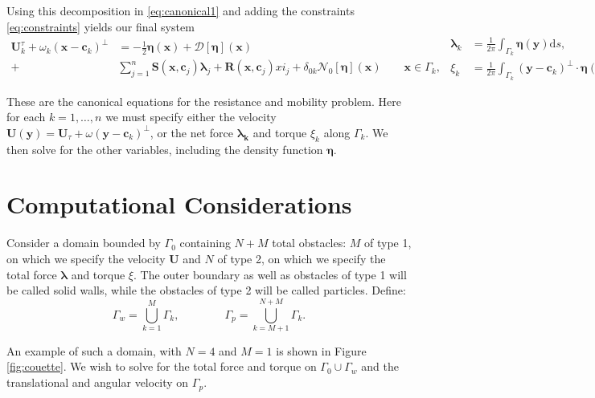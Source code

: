 Using this decomposition in \eqref{eq:canonical1} and adding the constraints \eqref{eq:constraints} yields our final system
\begin{subequations}\label{eq:canonical}
\begin{equation}\label{eq:canonical_a}
\begin{aligned}
	 \mathbf{U}^\tau_k + \omega_k(\mathbf{x} - \mathbf{c}_k)^\perp &= -\frac{1}{2}\pmb{\eta}(\mathbf{x}) + \mathcal{D}[\pmb{\eta}](\mathbf{x}) \\+ &\sum\limits_{j=1}^n \mathbf{S}(\mathbf{x},\mathbf{c}_j)\pmb{\lambda}_j + \mathbf{R}(\mathbf{x},\mathbf{c}_j)xi_j + \delta_{0k}\mathcal{N}_0[\pmb{\eta}](\mathbf{x}) \qquad \mathbf{x}\in\Gamma_k,
\end{aligned}
\end{equation}
\begin{align}
	\pmb{\lambda}_k &= \frac{1}{2\pi} \int_{\Gamma_k} \pmb{\eta}(\mathbf{y}) \text{d}s,\\
	\xi_k &= \frac{1}{2\pi}\int_{\Gamma_k} (\mathbf{y} - \mathbf{c}_k)^\perp \cdot\pmb{\eta}(\mathbf{y})\text{d}s.
\end{align}
\end{subequations}

These are the canonical equations \cite{Karrila1989} for the resistance and mobility problem. Here for each $k = 1,\hdots, n$ we must specify either the velocity $\mathbf{U}(\mathbf{y}) = \mathbf{U}_\tau + \omega(\mathbf{y} - \mathbf{c}_k)^\perp$, or the net force $\pmb{\lambda_k}$ and torque $\xi_k$ along $\Gamma_k$. We then solve for the other variables, including the density function $\pmb{\eta}$.

\section{Computational Considerations}

Consider a domain bounded by $\Gamma_0$ containing $N + M$ total obstacles: $M $ of type 1, on which we specify the velocity $\mathbf{U}$ and $N$ of type 2, on which we specify the total force $\pmb{\lambda}$ and torque $\xi$. The outer boundary as well as obstacles of type 1 will be called solid walls, while the obstacles of type 2 will be called particles. Define:
\[ \Gamma_w = \bigcup\limits_{k=1}^M \Gamma_k, \qquad\qquad \Gamma_p = \bigcup\limits_{k=M+1}^{N+M} \Gamma_k.\]

An example of such a domain, with $N=4$ and $M=1$ is shown in Figure \ref{fig:couette}. We wish to solve for the total force and torque on $\Gamma_0 \cup \Gamma_w$ and the translational and angular velocity on $\Gamma_p$. 

